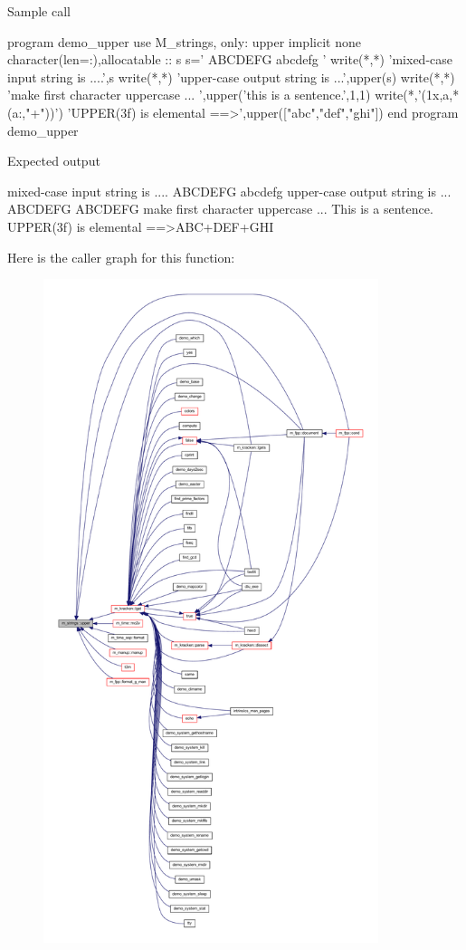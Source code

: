 \begin{DoxyVerb}Sample call

 program demo_upper
 use M_strings, only: upper
 implicit none
 character(len=:),allocatable  :: s
    s=' ABCDEFG abcdefg '
    write(*,*) 'mixed-case input string is ....',s
    write(*,*) 'upper-case output string is ...',upper(s)
    write(*,*) 'make first character uppercase  ... ',upper('this is a sentence.',1,1)
    write(*,'(1x,a,*(a:,"+"))') 'UPPER(3f) is elemental ==>',upper(["abc","def","ghi"])
 end program demo_upper

Expected output

 mixed-case input string is .... ABCDEFG abcdefg
 upper-case output string is ... ABCDEFG ABCDEFG
 make first character uppercase  ... This is a sentence.
 UPPER(3f) is elemental ==>ABC+DEF+GHI \end{DoxyVerb}
 Here is the caller graph for this function\+:
\nopagebreak
\begin{figure}[H]
\begin{center}
\leavevmode
\includegraphics[height=550pt]{namespacem__strings_a0953ac5c4d31339fdd8ec3acc9c3c915_icgraph}
\end{center}
\end{figure}
\mbox{\label{namespacem__strings_a76a00e3ca7fb7c9b9cadcd484c6e3946}} 
